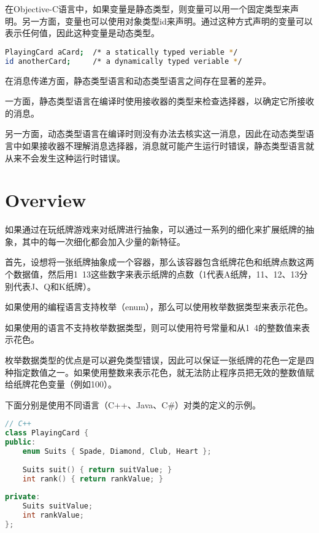 在Objective-C语言中，如果变量是静态类型，则变量可以用一个固定类型来声明。另一方面，变量也可以使用对象类型id来声明。通过这种方式声明的变量可以表示任何值，因此这种变量是动态类型。

\begin{lstlisting}[language=bash]
PlayingCard aCard;	/* a statically typed veriable */
id anotherCard;		/* a dynamically typed veriable */
\end{lstlisting}

在消息传递方面，静态类型语言和动态类型语言之间存在显著的差异。

一方面，静态类型语言在编译时使用接收器的类型来检查选择器，以确定它所接收的消息。

另一方面，动态类型语言在编译时则没有办法去核实这一消息，因此在动态类型语言中如果接收器不理解消息选择器，消息就可能产生运行时错误，静态类型语言就从来不会发生这种运行时错误。

\section{Overview}

如果通过在玩纸牌游戏来对纸牌进行抽象，可以通过一系列的细化来扩展纸牌的抽象，其中的每一次细化都会加入少量的新特征。

首先，设想将一张纸牌抽象成一个容器，那么该容器包含纸牌花色和纸牌点数这两个数据值，然后用1~13这些数字来表示纸牌的点数（1代表A纸牌，11、12、13分别代表J、Q和K纸牌）。

\begin{compactitem}
\item 如果使用的编程语言支持枚举（enum），那么可以使用枚举数据类型来表示花色。
\item 如果使用的语言不支持枚举数据类型，则可以使用符号常量和从1~4的整数值来表示花色。
\end{compactitem}


枚举数据类型的优点是可以避免类型错误，因此可以保证一张纸牌的花色一定是四种指定数值之一。如果使用整数来表示花色，就无法防止程序员把无效的整数值赋给纸牌花色变量（例如100）。



下面分别是使用不同语言（C++、Java、C\#）对类的定义的示例。

\begin{lstlisting}[language=C++]
// C++
class PlayingCard {
public:
	enum Suits { Spade, Diamond, Club, Heart };
	
	Suits suit() { return suitValue; }
	int rank() { return rankValue; }
	
private:
	Suits suitValue;
	int rankValue;
};
\end{lstlisting}



